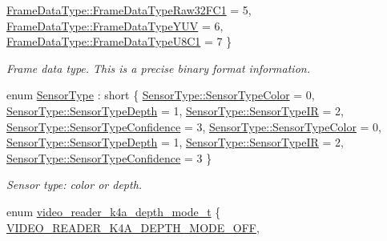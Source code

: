 \begin{DoxyCompactItemize}
\hyperlink{namespacemoetsi_1_1ssp_aa9b059f0bc7a91855545ee887f2d56c4abb6735708adc6efcecf59e0e1e6c9387}{Frame\+Data\+Type\+::\+Frame\+Data\+Type\+Raw32\+F\+C1} = 5, 
\hyperlink{namespacemoetsi_1_1ssp_aa9b059f0bc7a91855545ee887f2d56c4a6191c61c70f47aa00e2f9251d8ad59fa}{Frame\+Data\+Type\+::\+Frame\+Data\+Type\+Y\+UV} = 6, 
\hyperlink{namespacemoetsi_1_1ssp_aa9b059f0bc7a91855545ee887f2d56c4acd5fc2d48d13ef44a9806046ae34d56b}{Frame\+Data\+Type\+::\+Frame\+Data\+Type\+U8\+C1} = 7
 \}\begin{DoxyCompactList}\small\item\em Frame data type. This is a precise binary format information. \end{DoxyCompactList}
\item 
enum \hyperlink{namespacemoetsi_1_1ssp_abd5a57e44ab71b73d2e32a59887474de}{Sensor\+Type} \+: short \{ \newline
\hyperlink{namespacemoetsi_1_1ssp_abd5a57e44ab71b73d2e32a59887474dea896d4c904dda3d40337f16257ad819c9}{Sensor\+Type\+::\+Sensor\+Type\+Color} = 0, 
\hyperlink{namespacemoetsi_1_1ssp_abd5a57e44ab71b73d2e32a59887474dea38c56a32340ea03dd83b817cdbc15dd9}{Sensor\+Type\+::\+Sensor\+Type\+Depth} = 1, 
\hyperlink{namespacemoetsi_1_1ssp_abd5a57e44ab71b73d2e32a59887474dea06604c7f56c3ee7bcc422afac6239543}{Sensor\+Type\+::\+Sensor\+Type\+IR} = 2, 
\hyperlink{namespacemoetsi_1_1ssp_abd5a57e44ab71b73d2e32a59887474dea8fc6ffe5307d7e91425ea4a160a45fa2}{Sensor\+Type\+::\+Sensor\+Type\+Confidence} = 3, 
\newline
\hyperlink{namespacemoetsi_1_1ssp_abd5a57e44ab71b73d2e32a59887474dea896d4c904dda3d40337f16257ad819c9}{Sensor\+Type\+::\+Sensor\+Type\+Color} = 0, 
\hyperlink{namespacemoetsi_1_1ssp_abd5a57e44ab71b73d2e32a59887474dea38c56a32340ea03dd83b817cdbc15dd9}{Sensor\+Type\+::\+Sensor\+Type\+Depth} = 1, 
\hyperlink{namespacemoetsi_1_1ssp_abd5a57e44ab71b73d2e32a59887474dea06604c7f56c3ee7bcc422afac6239543}{Sensor\+Type\+::\+Sensor\+Type\+IR} = 2, 
\hyperlink{namespacemoetsi_1_1ssp_abd5a57e44ab71b73d2e32a59887474dea8fc6ffe5307d7e91425ea4a160a45fa2}{Sensor\+Type\+::\+Sensor\+Type\+Confidence} = 3
 \}\begin{DoxyCompactList}\small\item\em Sensor type\+: color or depth. \end{DoxyCompactList}
\item 
enum \hyperlink{namespacemoetsi_1_1ssp_af6191b9987a717b7565c9c92b8f75a79}{video\+\_\+reader\+\_\+k4a\+\_\+depth\+\_\+mode\+\_\+t} \{ \newline
\hyperlink{namespacemoetsi_1_1ssp_af6191b9987a717b7565c9c92b8f75a79a66710f575344b266cdc94c8b51555448}{V\+I\+D\+E\+O\+\_\+\+R\+E\+A\+D\+E\+R\+\_\+\+K4\+A\+\_\+\+D\+E\+P\+T\+H\+\_\+\+M\+O\+D\+E\+\_\+\+O\+FF}, 

\end{DoxyCompactItemize}

